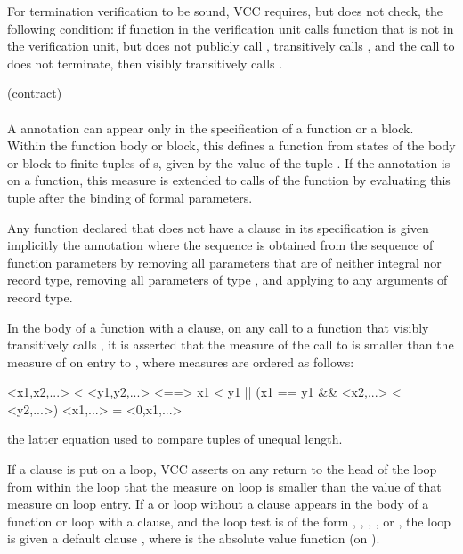 \documentclass[preprint,nocopyrightspace]{sigplanconf}
\begin{document}
{{{{\begin{VCC}
For termination verification to be sound, VCC requires, but does not
check, the following condition: if function  in the
verification unit calls function  that is not in the
verification unit, but does not publicly call , 
transitively calls , and the call to  does not
terminate, then  visibly transitively calls .

 (contract)\\
\\
A  annotation can appear only in the specification of a function or
a block. Within the
function body or block, this defines a function from states of the
body or block to finite tuples of \vcc{\natural}s, given by the value
of the tuple . If the annotation is on a function,
this measure is extended to calls of the function by evaluating this
tuple after the binding of formal parameters. 

Any function declared  that does not have
a  clause in its specification is given implicitly
the annotation  where the
sequence  is obtained from the sequence of function
parameters by removing all parameters that are of neither 
integral nor record type, removing all parameters of type \vcc{\bool},
and applying  to any arguments of record type.

In the body of a function  with a  clause, on
any call to a function  that visibly transitively calls ,
it is asserted that the measure of the call to  is smaller
than the measure of  on entry to , where measures are
ordered as follows:
\begin{VCC}
<x1,x2,...> < <y1,y2,...> <==> x1 < y1 || (x1 == y1 && <x2,...> < <y2,...>)
<x1,...> = <0,x1,...>
\end{VCC}
the latter equation used to compare tuples of unequal length.

If a  clause is put on a loop, VCC asserts on any
return to the head of the loop from within the loop that the measure
on loop is smaller than the value of that measure on loop entry. If a
 or  loop without a  clause appears in the body of a function
or loop with a  clause, and the loop test is of the
form , , , ,
or , the loop is given a default clause 
, where  is the absolute value function
(on \vcc{\integer}). 


\end{VCC}}}}}
\end{document}
